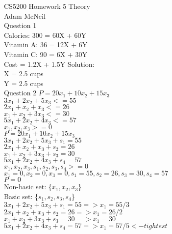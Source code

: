 \documentclass{article}
\begin{document}
CS5200 Homework 5 Theory \\
Adam McNeil \\
Question 1 \\
Calories: 300 = 60X + 60Y \\
Vitamin A: 36 = 12X + 6Y \\ 
Vitamin C: 90 = 6X + 30Y \\
Cost = 1.2X + 1.5Y
Solution:\\
X = 2.5 cups\\
Y = 2.5 cups\\

Question 2
${P = 20x_1 + 10x_2 + 15x_3}$ \\
${     3x_1 +  2x_2 +  5x_3 <= 55}$\\
${     2x_1 +   x_2 +   x_3 <= 26}$\\
${      x_1 +   x_2 +  3x_3 <= 30}$\\
${     5x_1 +  2x_2 +  4x_3 <= 57}$\\
${      x_1 ,   x_2 ,   x_3 >=  0}$\\


${P = 20x_1 + 10x_2 + 15x_3}$ \\
${     3x_1 +  2x_2 +  5x_3 + s_1 = 55}$\\
${     2x_1 +   x_2 +   x_3 + s_2 = 26}$\\
${      x_1 +   x_2 +  3x_3 + s_3 = 30}$\\
${     5x_1 +  2x_2 +  4x_3 + s_4 = 57}$\\
${      x_1 ,   x_2 ,   x_3, s_1, s_2, s_3, s_4 >=  0}$\\

${      x_1 = 0, x_2 = 0, x_3 = 0, s_1 = 55, s_2 = 26, s_3 = 30, s_4 = 57}$\\
${P = 0}$\\
Non-basic set: \{${x_1, x_2, x_3}$\}\\
Basic set: \{${s_1, s_2, s_3, s_4}$\}\\

${     3x_1 +  2x_2 +  5x_3 + s_1 = 55 => x_1=55/3}$\\
${     2x_1 +   x_2 +   x_3 + s_2 = 26 => x_1=26/2}$\\
${      x_1 +   x_2 +  3x_3 + s_3 = 30 => x_1=30  }$\\
${     5x_1 +  2x_2 +  4x_3 + s_4 = 57 => x_1=57/5 <- tightest}$\\
\end{document}
